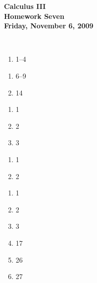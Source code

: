 \documentclass[12pt]{article}
\begin{document}
\pagestyle{empty}
 
\begin{center}
{\large {\bf Calculus III}}\\
\medskip
{\large {\bf Homework Seven}}\\
\medskip
{ {\bf Friday, November 6, 2009}}\\
\end{center}

\hspace{2mm}\\




\begin{enumerate}
\setlength{\itemsep}{-1mm}
  \item 1--4
\end{enumerate}


\begin{enumerate}
\setlength{\itemsep}{-1mm}
  \item 6--9
  \item 14
\end{enumerate}

\begin{enumerate}
\setlength{\itemsep}{-1mm}
  \item 1
  \item 2
  \item 3
\end{enumerate}


\begin{enumerate}
\setlength{\itemsep}{-1mm}
  \item 1
  \item 2
\end{enumerate}

\begin{enumerate}
\setlength{\itemsep}{-1mm}
  \item 1
  \item 2
  \item 3
  \item 17
  \item 26
  \item 27
\end{enumerate}
\end{document}
